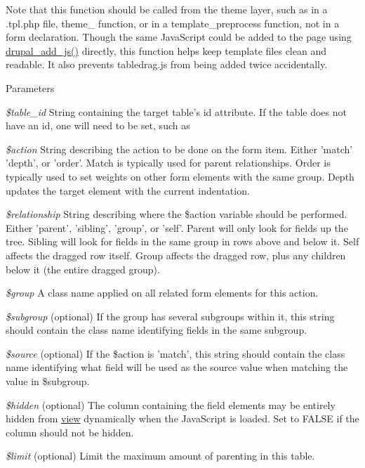 Note that this function should be called from the theme layer, such as in a .tpl.php file, theme\_\- function, or in a template\_\-preprocess function, not in a form declaration. Though the same JavaScript could be added to the page using \hyperlink{common_8inc_a623370a2c3c2de0390dab078d17dca02}{drupal\_\-add\_\-js()} directly, this function helps keep template files clean and readable. It also prevents tabledrag.js from being added twice accidentally.


\begin{DoxyParams}{Parameters}
\item[{\em \$table\_\-id}]String containing the target table's id attribute. If the table does not have an id, one will need to be set, such as \begin{TabularC}{0}
\hline
\end{TabularC}
\item[{\em \$action}]String describing the action to be done on the form item. Either 'match' 'depth', or 'order'. Match is typically used for parent relationships. Order is typically used to set weights on other form elements with the same group. Depth updates the target element with the current indentation. \item[{\em \$relationship}]String describing where the \$action variable should be performed. Either 'parent', 'sibling', 'group', or 'self'. Parent will only look for fields up the tree. Sibling will look for fields in the same group in rows above and below it. Self affects the dragged row itself. Group affects the dragged row, plus any children below it (the entire dragged group). \item[{\em \$group}]A class name applied on all related form elements for this action. \item[{\em \$subgroup}](optional) If the group has several subgroups within it, this string should contain the class name identifying fields in the same subgroup. \item[{\em \$source}](optional) If the \$action is 'match', this string should contain the class name identifying what field will be used as the source value when matching the value in \$subgroup. \item[{\em \$hidden}](optional) The column containing the field elements may be entirely hidden from \hyperlink{classview}{view} dynamically when the JavaScript is loaded. Set to FALSE if the column should not be hidden. \item[{\em \$limit}](optional) Limit the maximum amount of parenting in this table. \end{DoxyParams}
